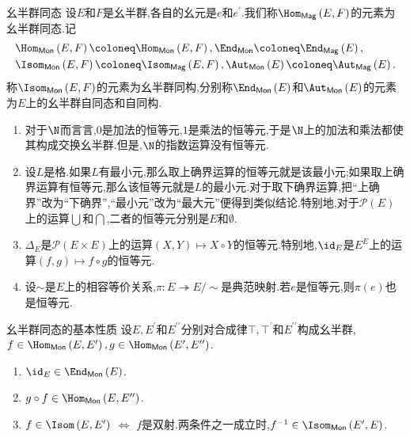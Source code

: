 \begin{definition}{幺半群同态}{}
	设$E$和$F$是幺半群,各自的幺元是$e$和$e^{\prime}$.我们称$\Hom_{\mathsf{Mag}}\left(E,F\right)$的元素为幺半群同态.记
	\begin{align*}
		&\Hom_{\mathsf{Mon}}\left(E,F\right)\coloneq\Hom_{\mathsf{Mon}}\left(E,F\right),\End_{\mathsf{Mon}}\coloneq\End_{\mathsf{Mag}}\left(E\right),\\
		&\Isom_{\mathsf{Mon}}\left(E,F\right)\coloneq\Isom_{\mathsf{Mag}}\left(E,F\right),\Aut_{\mathsf{Mon}}\left(E\right)\coloneq\Aut_{\mathsf{Mag}}\left(E\right).
	\end{align*}
	称$\Isom_{\mathsf{Mon}}\left(E,F\right)$的元素为幺半群同构,分别称$\End_{\mathsf{Mon}}\left(E\right)$和$\Aut_{\mathsf{Mon}}\left(E\right)$的元素为$E$上的幺半群自同态和自同构.
\end{definition}

\begin{example}{}{}
	\begin{enumerate}
		\item 对于$\N$而言言,$0$是加法的恒等元,$1$是乘法的恒等元,于是$\N$上的加法和乘法都使其构成交换幺半群.但是,$\N$的指数运算没有恒等元.
		\item 设$L$是格.如果$L$有最小元,那么取上确界运算的恒等元就是该最小元;如果取上确界运算有恒等元,那么该恒等元就是$L$的最小元.对于取下确界运算,把``上确界''改为``下确界'',``最小元''改为``最大元''便得到类似结论.特别地,对于$\mathcal{P}\left(E\right)$上的运算$\bigcup$和$\bigcap$,二者的恒等元分别是$E$和$\emptyset$.
		\item $\Delta_{E}$是$\mathcal{P}\left(E\times E\right)$上的运算$\left(X,Y\right)\mapsto X\circ Y$的恒等元.特别地,$\id_{E}$是$E^{E}$上的运算$\left(f,g\right)\mapsto f\circ g$的恒等元.
		\item 设$\sim$是$E$上的相容等价关系,$\pi:E\twoheadrightarrow E/\sim$是典范映射.若$e$是恒等元,则$\pi\left(e\right)$也是恒等元.
	\end{enumerate}
\end{example}

\begin{theorem}{幺半群同态的基本性质}{}
	设$E,E^{\prime}$和$E^{\prime\prime}$分别对合成律$\top,\top^{\prime}$和$E^{\prime\prime}$构成幺半群,$f\in\Hom_{\mathsf{Mon}}\left(E,E^{\prime}\right),g\in\Hom_{\mathsf{Mon}}\left(E^{\prime},E^{\prime\prime}\right)$.
	\begin{enumerate}
		\item $\id_{E}\in\End_{\mathsf{Mon}}\left(E\right)$.
		\item $g\circ f\in\Hom_{\mathsf{Mon}}\left(E,E^{\prime\prime}\right)$.
		\item $f\in\Isom\left(E,E^{\prime}\right)$ $\iff$ $f$是双射.两条件之一成立时,$f^{-1}\in\Isom_{\mathsf{Mon}}\left(E^{\prime},E\right)$.
	\end{enumerate}
\end{theorem}

